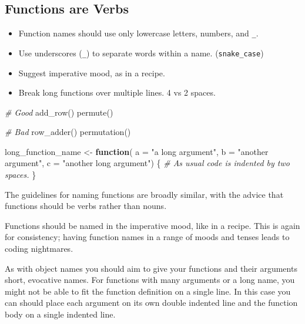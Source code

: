 \documentclass[
  12pt,
]{book}
\newenvironment{Shaded}{\begin{snugshade}}{\end{snugshade}}
\newcommand{\AttributeTok}[1]{\textcolor[rgb]{0.77,0.63,0.00}{#1}}
\newcommand{\CommentTok}[1]{\textcolor[rgb]{0.56,0.35,0.01}{\textit{#1}}}
\newcommand{\ControlFlowTok}[1]{\textcolor[rgb]{0.13,0.29,0.53}{\textbf{#1}}}
\newcommand{\FunctionTok}[1]{\textcolor[rgb]{0.00,0.00,0.00}{#1}}
\newcommand{\NormalTok}[1]{#1}
\newcommand{\OtherTok}[1]{\textcolor[rgb]{0.56,0.35,0.01}{#1}}
\newcommand{\StringTok}[1]{\textcolor[rgb]{0.31,0.60,0.02}{#1}}
\begin{document}
\hypertarget{functions-are-verbs}{%
\subsection{Functions are Verbs}\label{functions-are-verbs}}

\begin{itemize}
\item
  Function names should use only lowercase letters, numbers, and \texttt{\_}.
\item
  Use underscores (\texttt{\_}) to separate words within a name. (\texttt{snake\_case})
\item
  Suggest imperative mood, as in a recipe.
\item
  Break long functions over multiple lines. 4 vs 2 spaces.
\end{itemize}

\begin{Shaded}
\begin{Highlighting}[]
\CommentTok{\# Good}
\FunctionTok{add\_row}\NormalTok{()}
\FunctionTok{permute}\NormalTok{()}

\CommentTok{\# Bad}
\FunctionTok{row\_adder}\NormalTok{()}
\FunctionTok{permutation}\NormalTok{()}

\NormalTok{long\_function\_name }\OtherTok{\textless{}{-}} \ControlFlowTok{function}\NormalTok{(}
    \AttributeTok{a =} \StringTok{"a long argument"}\NormalTok{,}
    \AttributeTok{b =} \StringTok{"another argument"}\NormalTok{,}
    \AttributeTok{c =} \StringTok{"another long argument"}\NormalTok{) \{}
  \CommentTok{\# As usual code is indented by two spaces.}
\NormalTok{\}}
\end{Highlighting}
\end{Shaded}

The guidelines for naming functions are broadly similar, with the advice that functions should be verbs rather than nouns.

Functions should be named in the imperative mood, like in a recipe. This is again for consistency; having function names in a range of moods and tenses leads to coding nightmares.

As with object names you should aim to give your functions and their arguments short, evocative names. For functions with many arguments or a long name, you might not be able to fit the function definition on a single line. In this case you can should place each argument on its own double indented line and the function body on a single indented line.
\end{document}
